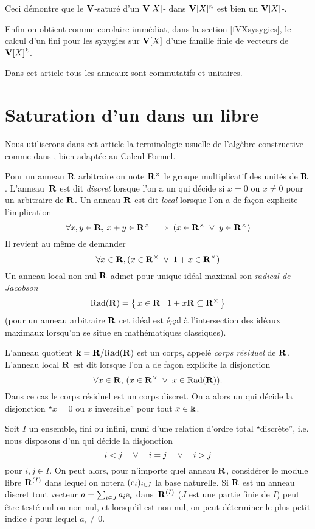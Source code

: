 Ceci démontre que le $\mathbf{V}$-saturé d'un $\mathbf{V}[X]$-\mtf
dans $\mathbf{V}[X]^n$ est bien un $\mathbf{V}[X]$-\mtf.

Enfin on obtient comme corolaire immédiat,
dans la section \ref{fVXsysygies}, le calcul
d'un \sgr fini pour les syzygies sur  $\mathbf{V}[X]$ d'une famille 
finie de vecteurs de $\mathbf{V}[X]^k$.



\medskip
Dans cet article tous les anneaux sont commutatifs et unitaires.




\section{Saturation d'un \Vmo \tf dans un \Vmo libre} \label{fsatVmotf}

Nous utiliserons dans cet article 
la terminologie usuelle de l'algèbre constructive comme
dans \citealt*{fMRR}, bien adaptée au Calcul Formel.


\smallskip Pour un anneau $\mathbf{R}$ arbitraire on note $\mathbf{R}^\times$ le groupe multiplicatif des unités de $\mathbf{R}$.
L'anneau~$\mathbf{R}$ est dit \textsl{discret} lorsque l'on a un \algo qui 
décide si $x=0$ ou $x\neq 0$ pour un \elt arbitraire de $\mathbf{R}$.
Un anneau $\mathbf{R}$ est dit \textsl{local} lorsque l'on a de fa{\c c}on explicite l'implication
\[
\forall x,y\in\mathbf{R},\,x+y\in\mathbf{R}^\times\; \Longrightarrow\;(x \in\mathbf{R}^\times\;\vee \;y\in\mathbf{R}^\times)
\]
Il revient au m\^eme de demander
\[
\forall x\in\mathbf{R},(x \in\mathbf{R}^\times\;\vee \;1+x\in\mathbf{R}^\times)
\]
Un anneau local non nul $\mathbf{R}$ admet pour unique idéal maximal son \textsl{radical de Jacobson} 
\[
\mathrm{Rad}(\mathbf{R})=\left\{{\,x\in\mathbf{R}\mid1+x\mathbf{R}\subseteq \mathbf{R}^\times\,}\right\}
\]
(pour un anneau arbitraire $\mathbf{R}$ cet idéal est égal à l'intersection des idéaux maximaux lorsqu'on se situe en mathématiques classiques).

L'anneau quotient $\mathbf{k}=\mathbf{R}/\mathrm{Rad}(\mathbf{R})$ est un corps, appelé \textsl{corps résiduel} de $\mathbf{R}$.
L'anneau local $\mathbf{R}$ est dit \textsl{\dcd} lorsque l'on a de fa{\c c}on explicite la disjonction 
\[\forall x\in\mathbf{R},\,(x\in\mathbf{R}^\times\;\vee\;x\in\mathrm{Rad}(\mathbf{R})).
\] 
Dans ce cas le corps résiduel est un corps discret. On a alors un \algo qui décide la disjonction  ``$x=0$ ou $x$ inversible'' pour tout $x\in\mathbf{k}$.

 
\medskip Soit $I$ un ensemble, fini ou infini, muni d'une relation d'ordre total ``discrète'', i.e. nous disposons d'un \algo qui décide la disjonction
$$i<j \quad \vee\quad  i=j \quad \vee\quad  i>j$$ 
pour $i,j\in I$. On peut alors, pour n'importe quel anneau $\mathbf{R}$, considérer le module libre $\mathbf{R}^{(I)}$ dans lequel on notera $(\mathrm{e}_i)_{i\in I}$ la base naturelle. Si $\mathbf{R}$ est un anneau discret tout
vecteur $a=\sum_{i\in J} a_i\mathrm{e}_i$ dans~$\mathbf{R}^{(I)}$
($J$ est une partie finie de $I$) peut \^etre testé nul ou non nul, et lorsqu'il est non nul, on peut déterminer le plus petit indice
$i$ pour lequel $a_i\neq 0$.

